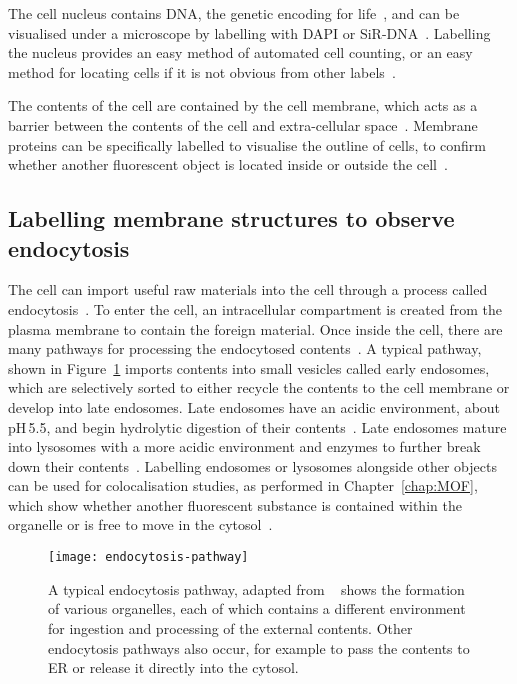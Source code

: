 The cell nucleus contains DNA, the genetic encoding for life~\cite{alberts2002molecular}, and can be visualised under a microscope by labelling with DAPI or SiR-DNA~\cite{kapuscinski1995dapi, lukinavivcius2015sir}. 
Labelling the nucleus provides an easy method of automated cell counting, or an easy method for locating cells if it is not obvious from other labels~\cite{porter1980use}. 

The contents of the cell are contained by the cell membrane, which acts as a barrier between the contents of the cell and extra-cellular space~\cite{alberts2013essential}. 
Membrane proteins can be specifically labelled to visualise the outline of cells, to confirm whether another fluorescent object is located inside or outside the cell~\cite{yano2009tag, lee2011fluorescent, chamma2017optimized}. 

\subsection{Labelling membrane structures to observe endocytosis}
The cell can import useful raw materials into the cell through a process called endocytosis~\cite{alberts2002molecular}. 
To enter the cell, an intracellular compartment is created from the plasma membrane to contain the foreign material.
Once inside the cell, there are many pathways for processing the endocytosed contents~\cite{marsh2001endocytosis, marsh1999structural, mcmahon2011molecular}. 
A typical pathway, shown in Figure~\ref{fig:endocytosis-pathway} imports contents into small vesicles called early endosomes, which are selectively sorted to either recycle the contents to the cell membrane or develop into late endosomes. 
Late endosomes have an acidic environment, about pH\,\num{5.5}, and begin hydrolytic digestion of their contents~\cite{geisow1984ph}. 
Late endosomes mature into lysosomes with a more acidic environment and enzymes to further break down their contents~\cite{alberts2002molecular}. 
Labelling endosomes or lysosomes alongside other objects can be used for colocalisation studies, as performed in Chapter~\ref{chap:MOF}, which show whether another fluorescent substance is contained within the organelle or is free to move in the cytosol~\cite{pike2017quantifying}. 

\begin{figure}[htbp!]
\centering
\texttt{[image: endocytosis-pathway]}
\captionsetup{singlelinecheck=off}
\caption[Introduction: Cells import external contents through endocytosis]{A typical endocytosis pathway, adapted from ~\cite{alberts2002molecular} shows the formation of various organelles, each of which contains a different environment for ingestion and processing of the external contents. Other endocytosis pathways also occur, for example to pass the contents to ER or release it directly into the cytosol. }
\label{fig:endocytosis-pathway}
\end{figure}

